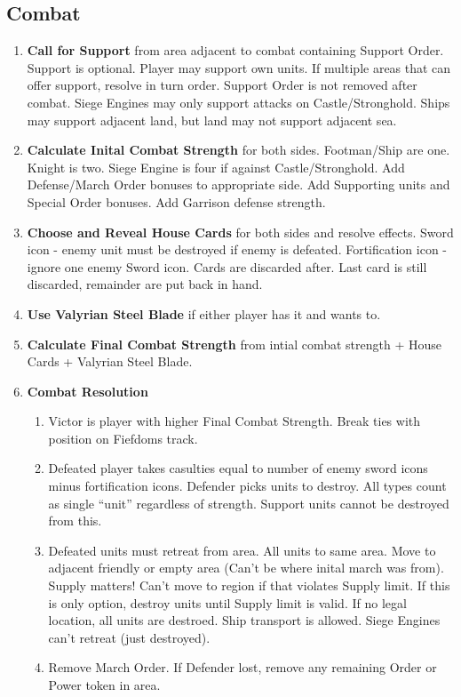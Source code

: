 \documentclass[12pt]{article}
\newenvironment{enumerateCustom}
{\begin{enumerate}
  \setlength{\itemsep}{1pt}
  \setlength{\parskip}{0pt}
  \setlength{\parsep}{0pt}}
{\end{enumerate}}
\begin{document}
\begin{multicols*}{2}
\section*{Combat}
\begin{enumerateCustom}
	\item \textbf{Call for Support} from area adjacent to combat containing Support Order. Support is optional. Player may support own units. If multiple areas that can offer support, resolve in turn order. Support Order is not removed after combat. Siege Engines may only support attacks on Castle/Stronghold. Ships may support adjacent land, but land may not support adjacent sea.
	\item \textbf{Calculate Inital Combat Strength} for both sides. Footman/Ship are one. Knight is two. Siege Engine is four if against Castle/Stronghold. Add Defense/March Order bonuses to appropriate side. Add Supporting units and Special Order bonuses. Add Garrison defense strength.
	\item \textbf{Choose and Reveal House Cards} for both sides and resolve effects. Sword icon - enemy unit must be destroyed if enemy is defeated. Fortification icon - ignore one enemy Sword icon. Cards are discarded after. Last card is still discarded, remainder are put back in hand.
	\item \textbf{Use Valyrian Steel Blade} if either player has it and wants to.
	\item \textbf{Calculate Final Combat Strength} from intial combat strength + House Cards + Valyrian Steel Blade.
	\item \textbf{Combat Resolution}
	\begin{enumerateCustom}
		\item Victor is player with higher Final Combat Strength. Break ties with position on Fiefdoms track.
		\item Defeated player takes casulties equal to number of enemy sword icons minus fortification icons. Defender picks units to destroy. All types count as single ``unit'' regardless of strength. Support units cannot be destroyed from this.
		\item Defeated units must retreat from area. All units to same area. Move to adjacent friendly or empty area (Can't be where inital march was from). Supply matters! Can't move to region if that violates Supply limit. If this is only option, destroy units until Supply limit is valid. If no legal location, all units are destroed. Ship transport is allowed. Siege Engines can't retreat (just destroyed).
		\item Remove March Order. If Defender lost, remove any remaining Order or Power token in area.
	\end{enumerateCustom}
\end{enumerateCustom}


\end{multicols*}
\end{document}
